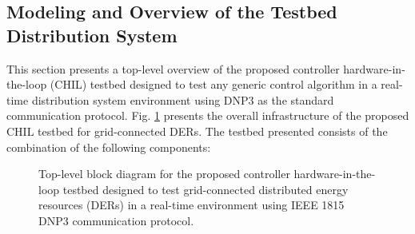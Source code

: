 \subsection{Modeling and Overview of the Testbed Distribution System}
This section presents a top-level overview of the proposed controller hardware-in-the-loop (CHIL) testbed designed to test any generic control algorithm in a real-time distribution system environment using DNP3 as the standard communication protocol. Fig. \ref{fig:overall_testbed} presents the overall infrastructure of the proposed CHIL testbed for grid-connected DERs. The testbed presented consists of the combination of the following components:


\begin{figure}
\centering
  \noindent{}
  \caption{Top-level block diagram for the proposed controller hardware-in-the-loop testbed designed to test grid-connected distributed energy resources (DERs) in a real-time environment using IEEE 1815 DNP3 communication protocol.}
  \label{fig:overall_testbed}
\end{figure}

